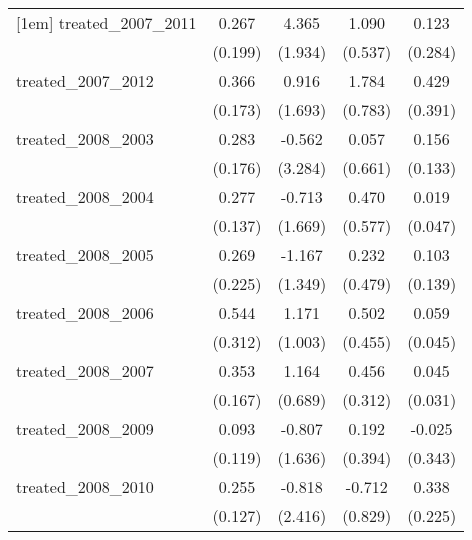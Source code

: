 {\begin{tabular}{l*{4}{c}}
[1em]
treated\_2007\_2011&       0.267         &       4.365\sym{*}  &       1.090\sym{*}  &       0.123         \\
            &     (0.199)         &     (1.934)         &     (0.537)         &     (0.284)         \\
[1em]
treated\_2007\_2012&       0.366\sym{*}  &       0.916         &       1.784\sym{*}  &       0.429         \\
            &     (0.173)         &     (1.693)         &     (0.783)         &     (0.391)         \\
[1em]
treated\_2008\_2003&       0.283         &      -0.562         &       0.057         &       0.156         \\
            &     (0.176)         &     (3.284)         &     (0.661)         &     (0.133)         \\
[1em]
treated\_2008\_2004&       0.277\sym{*}  &      -0.713         &       0.470         &       0.019         \\
            &     (0.137)         &     (1.669)         &     (0.577)         &     (0.047)         \\
[1em]
treated\_2008\_2005&       0.269         &      -1.167         &       0.232         &       0.103         \\
            &     (0.225)         &     (1.349)         &     (0.479)         &     (0.139)         \\
[1em]
treated\_2008\_2006&       0.544         &       1.171         &       0.502         &       0.059         \\
            &     (0.312)         &     (1.003)         &     (0.455)         &     (0.045)         \\
[1em]
treated\_2008\_2007&       0.353\sym{*}  &       1.164         &       0.456         &       0.045         \\
            &     (0.167)         &     (0.689)         &     (0.312)         &     (0.031)         \\
[1em]
treated\_2008\_2009&       0.093         &      -0.807         &       0.192         &      -0.025         \\
            &     (0.119)         &     (1.636)         &     (0.394)         &     (0.343)         \\
[1em]
treated\_2008\_2010&       0.255\sym{*}  &      -0.818         &      -0.712         &       0.338         \\
            &     (0.127)         &     (2.416)         &     (0.829)         &     (0.225)         \\

\end{tabular}}
